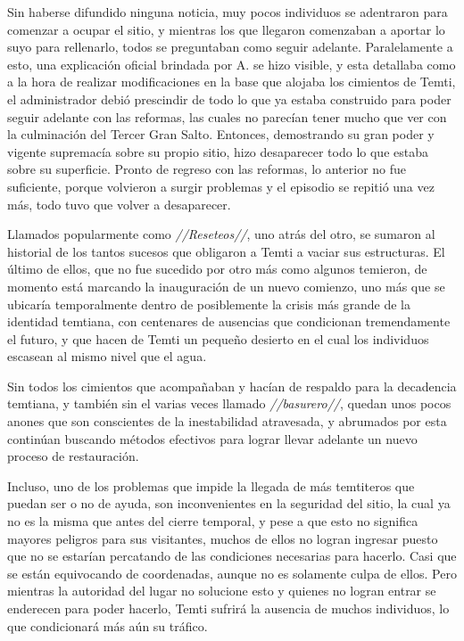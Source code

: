 \documentclass[
  spanish,
]{book}
\begin{document}
Sin haberse difundido ninguna noticia, muy pocos individuos se adentraron para comenzar a ocupar el sitio, y mientras los que llegaron comenzaban a aportar lo suyo para rellenarlo, todos se preguntaban como seguir adelante.
Paralelamente a esto, una explicación oficial brindada por A. se hizo visible, y esta detallaba como a la hora de realizar modificaciones en la base que alojaba los cimientos de Temti, el administrador debió prescindir de todo lo que ya estaba construido para poder seguir adelante con las reformas, las cuales no parecían tener mucho que ver con la culminación del Tercer Gran Salto. Entonces, demostrando su gran poder y vigente supremacía sobre su propio sitio, hizo desaparecer todo lo que estaba sobre su superficie. Pronto de regreso con las reformas, lo anterior no fue suficiente, porque volvieron a surgir problemas y el episodio se repitió una vez más, todo tuvo que volver a desaparecer.

Llamados popularmente como \emph{//Reseteos//}, uno atrás del otro, se sumaron al historial de los tantos sucesos que obligaron a Temti a vaciar sus estructuras. El último de ellos, que no fue sucedido por otro más como algunos temieron, de momento está marcando la inauguración de un nuevo comienzo, uno más que se ubicaría temporalmente dentro de posiblemente la crisis más grande de la identidad temtiana, con centenares de ausencias que condicionan tremendamente el futuro, y que hacen de Temti un pequeño desierto en el cual los individuos escasean al mismo nivel que el agua.

Sin todos los cimientos que acompañaban y hacían de respaldo para la decadencia temtiana, y también sin el varias veces llamado \emph{//basurero//}, quedan unos pocos anones que son conscientes de la inestabilidad atravesada, y abrumados por esta continúan buscando métodos efectivos para lograr llevar adelante un nuevo proceso de restauración.

Incluso, uno de los problemas que impide la llegada de más temtiteros que puedan ser o no de ayuda, son inconvenientes en la seguridad del sitio, la cual ya no es la misma que antes del cierre temporal, y pese a que esto no significa mayores peligros para sus visitantes, muchos de ellos no logran ingresar puesto que no se estarían percatando de las condiciones necesarias para hacerlo. Casi que se están equivocando de coordenadas, aunque no es solamente culpa de ellos. Pero mientras la autoridad del lugar no solucione esto y quienes no logran entrar se enderecen para poder hacerlo, Temti sufrirá la ausencia de muchos individuos, lo que condicionará más aún su tráfico.
\end{document}
